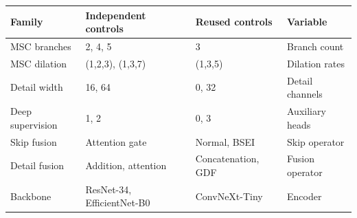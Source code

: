 \begin{tabular}{llll}
\hline
Family & Independent controls & Reused controls & Variable \\
\hline
MSC branches & 2, 4, 5 & 3 & Branch count \\
MSC dilation & (1,2,3), (1,3,7) & (1,3,5) & Dilation rates \\
Detail width & 16, 64 & 0, 32 & Detail channels \\
Deep supervision & 1, 2 & 0, 3 & Auxiliary heads \\
Skip fusion & Attention gate & Normal, BSEI & Skip operator \\
Detail fusion & Addition, attention & Concatenation, GDF & Fusion operator \\
Backbone & ResNet-34, EfficientNet-B0 & ConvNeXt-Tiny & Encoder \\
\hline
\end{tabular}
